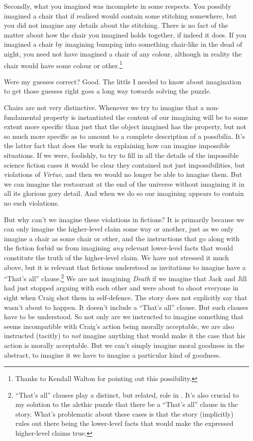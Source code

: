 Secondly, what you imagined was incomplete in some respects. You possibly imagined a chair that if realised would contain some stitching somewhere, but you did not imagine any details about the stitching. There is no fact of the matter about how the chair you imagined holds together, if indeed it does. If you imagined a chair by imagining bumping into something chair-like in the dead of night, you need not have imagined a chair of any colour, although in reality the chair would have some colour or other.\footnote{Thanks to Kendall Walton for pointing out this possibility.}

Were my guesses correct? Good. The little I needed to know about imagination to get those guesses right goes a long way towards solving the puzzle.

Chairs are not very distinctive. Whenever we try to imagine that a non\hyp{}fundamental property is instantiated the content of our imagining will be to some extent more specific than just that the object imagined has the property, but not so much more specific as to amount to a complete description of a possibilia. It's the latter fact that does the work in explaining how can imagine impossible situations. If we were, foolishly, to try to fill in all the details of the impossible science fiction cases it would be clear they contained not just impossibilities, but violations of \textit{Virtue}, and then we would no longer be able to imagine them. But we can imagine the restaurant at the end of the universe without imagining it in all its glorious gory detail. And when we do so our imagining appears to contain no such violations.

But why can't we imagine these violations in fictions? It is primarily because we can only imagine the higher-level claim some way or another, just as we only imagine a chair as some chair or other, and the instructions that go along with the fiction forbid us from imagining \textit{any} relevant lower-level facts that would constitute the truth of the higher-level claim. We have not stressed it much above, but it is relevant that fictions understood as invitations to imagine have a ``That's all'' clause.\footnote{``That's all'' clauses play a distinct, but related, role in \cite[Ch. 1]{Jackson1998}. It's also crucial to my solution to the alethic puzzle that there be a ``That's all'' clause in the story. What's problematic about these cases is that the story (implicitly) rules out there being the lower-level facts that would make the expressed higher-level claims true.} We are not imagining \textit{Death} if we imagine that Jack and Jill had just stopped arguing with each other and were about to shoot everyone in sight when Craig shot them in self-defence. The story does not explicitly say that wasn't about to happen. It doesn't include a ``That's all'' clause. But such clauses have to be understood. So not only are we instructed to imagine something that seems incompatible with Craig's action being morally acceptable, we are also instructed (tacitly) to \textit{not} imagine anything that would make it the case that his action is morally acceptable. But we can't simply imagine moral goodness in the abstract, to imagine it we have to imagine a particular kind of goodness. 

